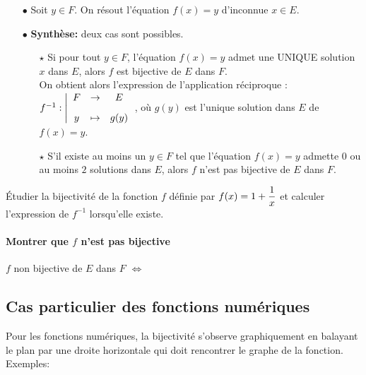 \documentclass[a4paper, 11pt]{article}
\begin{document}
\setlength\fboxrule{1pt}
{

\begin{itemize}
	\item[$\bullet$] Soit $y\in F$. On r\'esout l'\'equation $f(x)=y$ d'inconnue $x \in E$.
	\item[$\bullet$] \textbf{Synth\`{e}se:} deux cas sont possibles.
		\begin{itemize}
			\item[$\star$] Si pour tout $y \in F$, l'\'equation $f(x)=y$ admet une UNIQUE solution $x$ dans $E$, alors $f$ est bijective de $E$ dans $F$.\\
				On obtient alors l'expression de l'application r\'eciproque :  $f^{-1}:  \left| \begin{array}{ccc}
						F & \rightarrow & E\vsec \\
						y & \mapsto     & g(y)
					\end{array}\right.$, o\`u $g(y)$ est l'unique solution dans $E$ de $f(x)=y$.
			\item[$\star$] S'il existe au moins un $y \in F$ tel que l'\'equation $f(x)=y$ admette $0$ ou au moins $2$ solutions dans $E$, alors $f$ n'est pas bijective de $E$ dans $F$.
		\end{itemize}
\end{itemize}

\begin{exercice}
	\'Etudier la bijectivit\'e de la fonction $f$ d\'efinie par $f(x)=1+\displaystyle\frac{1}{x}$ et calculer l'expression de $f^{-1}$ lorsqu'elle existe.
\end{exercice}



\paragraph{Montrer que $f$ n'est pas bijective}
%
%
%
$f$ non bijective de $E$ dans $F$ $\Leftrightarrow$ \dotfill
\subsection{Cas particulier des fonctions num\'eriques}


\begin{rem}
	Pour les fonctions num\'eriques, la bijectivit\'e s'observe graphiquement en balayant le plan par une droite horizontale qui doit rencontrer \dotfill le graphe de la fonction.\\
	\noindent Exemples:




\end{rem}}
\end{document}
